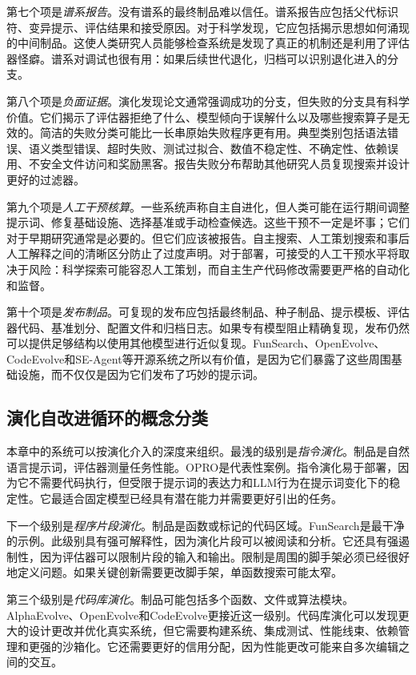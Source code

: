 第七个项是\emph{谱系报告}。没有谱系的最终制品难以信任。谱系报告应包括父代标识符、变异提示、评估结果和接受原因。对于科学发现，它应包括揭示思想如何涌现的中间制品。这使人类研究人员能够检查系统是发现了真正的机制还是利用了评估器怪癖。谱系对调试也很有用：如果后续世代退化，归档可以识别退化进入的分支。

第八个项是\emph{负面证据}。演化发现论文通常强调成功的分支，但失败的分支具有科学价值。它们揭示了评估器拒绝了什么、模型倾向于误解什么以及哪些搜索算子是无效的。简洁的失败分类可能比一长串原始失败程序更有用。典型类别包括语法错误、语义类型错误、超时失败、测试过拟合、数值不稳定性、不确定性、依赖误用、不安全文件访问和奖励黑客。报告失败分布帮助其他研究人员复现搜索并设计更好的过滤器。

第九个项是\emph{人工干预核算}。一些系统声称自主自进化，但人类可能在运行期间调整提示词、修复基础设施、选择基准或手动检查候选。这些干预不一定是坏事；它们对于早期研究通常是必要的。但它们应该被报告。自主搜索、人工策划搜索和事后人工解释之间的清晰区分防止了过度声明。对于部署，可接受的人工干预水平将取决于风险：科学探索可能容忍人工策划，而自主生产代码修改需要更严格的自动化和监督。

第十个项是\emph{发布制品}。可复现的发布应包括最终制品、种子制品、提示模板、评估器代码、基准划分、配置文件和归档日志。如果专有模型阻止精确复现，发布仍然可以提供足够结构以使用其他模型进行近似复现。FunSearch、OpenEvolve、CodeEvolve和SE-Agent等开源系统之所以有价值，是因为它们暴露了这些周围基础设施，而不仅仅是因为它们发布了巧妙的提示词。

\subsection{演化自改进循环的概念分类}
\label{subsec:evolution-taxonomy-loops}

本章中的系统可以按演化介入的深度来组织。最浅的级别是\emph{指令演化}。制品是自然语言提示词，评估器测量任务性能。OPRO是代表性案例。指令演化易于部署，因为它不需要代码执行，但受限于提示词的表达力和LLM行为在提示词变化下的稳定性。它最适合固定模型已经具有潜在能力并需要更好引出的任务。

下一个级别是\emph{程序片段演化}。制品是函数或标记的代码区域。FunSearch是最干净的示例。此级别具有强可解释性，因为演化片段可以被阅读和分析。它还具有强遏制性，因为评估器可以限制片段的输入和输出。限制是周围的脚手架必须已经很好地定义问题。如果关键创新需要更改脚手架，单函数搜索可能太窄。

第三个级别是\emph{代码库演化}。制品可能包括多个函数、文件或算法模块。AlphaEvolve、OpenEvolve和CodeEvolve更接近这一级别。代码库演化可以发现更大的设计更改并优化真实系统，但它需要构建系统、集成测试、性能线束、依赖管理和更强的沙箱化。它还需要更好的信用分配，因为性能更改可能来自多次编辑之间的交互。

